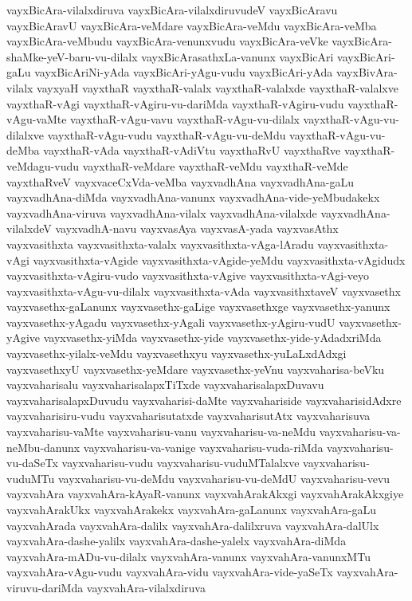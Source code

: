 {vayxBicAra-vilalxdiruva
vayxBicAra-vilalxdiruvudeV
vayxBicAravu
vayxBicAravU
vayxBicAra-veMdare
vayxBicAra-veMdu
vayxBicAra-veMba
vayxBicAra-veMbudu
vayxBicAra-venunxvudu
vayxBicAra-veVke
vayxBicAra-shaMke-yeV-baru-vu-dilalx
vayxBicArasathxLa-vanunx
vayxBicAri
vayxBicAri-gaLu
vayxBicAriNi-yAda
vayxBicAri-yAgu-vudu
vayxBicAri-yAda
vayxBivAra-vilalx
vayxyaH
vayxthaR
vayxthaR-valalx
vayxthaR-valalxde
vayxthaR-valalxve
vayxthaR-vAgi
vayxthaR-vAgiru-vu-dariMda
vayxthaR-vAgiru-vudu
vayxthaR-vAgu-vaMte
vayxthaR-vAgu-vavu
vayxthaR-vAgu-vu-dilalx
vayxthaR-vAgu-vu-dilalxve
vayxthaR-vAgu-vudu
vayxthaR-vAgu-vu-deMdu
vayxthaR-vAgu-vu-deMba
vayxthaR-vAda
vayxthaR-vAdiVtu
vayxthaRvU
vayxthaRve
vayxthaR-veMdagu-vudu
vayxthaR-veMdare
vayxthaR-veMdu
vayxthaR-veMde
vayxthaRveV
vayxvaceCxVda-veMba
vayxvadhAna
vayxvadhAna-gaLu
vayxvadhAna-diMda
vayxvadhAna-vanunx
vayxvadhAna-vide-yeMbudakekx
vayxvadhAna-viruva
vayxvadhAna-vilalx
vayxvadhAna-vilalxde
vayxvadhAna-vilalxdeV
vayxvadhA-navu
vayxvasAya
vayxvasA-yada
vayxvasAthx
vayxvasithxta
vayxvasithxta-valalx
vayxvasithxta-vAga-lAradu
vayxvasithxta-vAgi
vayxvasithxta-vAgide
vayxvasithxta-vAgide-yeMdu
vayxvasithxta-vAgidudx
vayxvasithxta-vAgiru-vudo
vayxvasithxta-vAgive
vayxvasithxta-vAgi-veyo
vayxvasithxta-vAgu-vu-dilalx
vayxvasithxta-vAda
vayxvasithxtaveV
vayxvasethx
vayxvasethx-gaLanunx
vayxvasethx-gaLige
vayxvasethxge
vayxvasethx-yanunx
vayxvasethx-yAgadu
vayxvasethx-yAgali
vayxvasethx-yAgiru-vudU
vayxvasethx-yAgive
vayxvasethx-yiMda
vayxvasethx-yide
vayxvasethx-yide-yAdadxriMda
vayxvasethx-yilalx-veMdu
vayxvasethxyu
vayxvasethx-yuLaLxdAdxgi
vayxvasethxyU
vayxvasethx-yeMdare
vayxvasethx-yeVnu
vayxvaharisa-beVku
vayxvaharisalu
vayxvaharisalapxTiTxde
vayxvaharisalapxDuvavu
vayxvaharisalapxDuvudu
vayxvaharisi-daMte
vayxvahariside
vayxvaharisidAdxre
vayxvaharisiru-vudu
vayxvaharisutatxde
vayxvaharisutAtx
vayxvaharisuva
vayxvaharisu-vaMte
vayxvaharisu-vanu
vayxvaharisu-va-neMdu
vayxvaharisu-va-neMbu-danunx
vayxvaharisu-va-vanige
vayxvaharisu-vuda-riMda
vayxvaharisu-vu-daSeTx
vayxvaharisu-vudu
vayxvaharisu-vuduMTalalxve
vayxvaharisu-vuduMTu
vayxvaharisu-vu-deMdu
vayxvaharisu-vu-deMdU
vayxvaharisu-vevu
vayxvahAra
vayxvahAra-kAyaR-vanunx
vayxvahArakAkxgi
vayxvahArakAkxgiye
vayxvahArakUkx
vayxvahArakekx
vayxvahAra-gaLanunx
vayxvahAra-gaLu
vayxvahArada
vayxvahAra-dalilx
vayxvahAra-dalilxruva
vayxvahAra-dalUlx
vayxvahAra-dashe-yalilx
vayxvahAra-dashe-yalelx
vayxvahAra-diMda
vayxvahAra-mADu-vu-dilalx
vayxvahAra-vanunx
vayxvahAra-vanunxMTu
vayxvahAra-vAgu-vudu
vayxvahAra-vidu
vayxvahAra-vide-yaSeTx
vayxvahAra-viruvu-dariMda
vayxvahAra-vilalxdiruva
}
